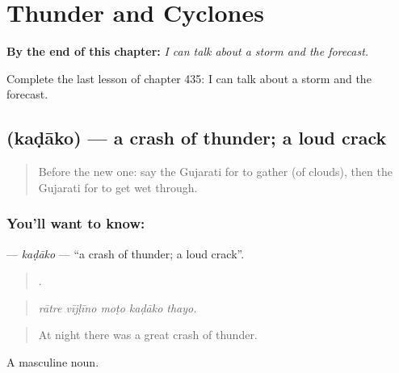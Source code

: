 
\chapter{Thunder and Cyclones}
\label{ch:gu-thunder-and-cyclones}

\begin{chapteropening}
\textbf{By the end of this chapter:} \emph{I can talk about a storm and the forecast.}

Complete the last lesson of chapter 435: I can talk about a storm and the forecast.
\end{chapteropening}

\section[\texorpdfstring{\gu{કડાકો} (kaḍāko)}{કડાકો (kaḍāko)}]{ (kaḍāko) — a crash of thunder; a loud crack}

\label{lesson:GU-C435-kadako}



\begin{quote}
Before the new one: say the Gujarati for to gather (of clouds), then the Gujarati for to get wet through.
\end{quote}

\subsection*{You'll want to know: }
\textbf{} — \emph{kaḍāko} — \textquotedblleft{}a crash of thunder; a loud crack\textquotedblright{}.

\begin{quote}
    .
\end{quote}

\begin{quote}
\emph{rātre vījḷīno moṭo kaḍāko thayo.}
\end{quote}

\begin{quote}
At night there was a great crash of thunder.
\end{quote}

A masculine noun.

